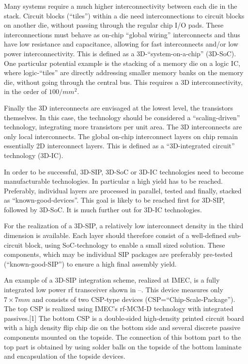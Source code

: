 Many systems require a much higher interconnectivity between
each die in the stack. Circuit blocks (``tiles'') within a die need
interconnections to circuit blocks on another die, without passing
through the regular chip I/O pads. These interconnections must
behave as on-chip ``global wiring'' interconnects and thus have low
resistance and capacitance, allowing for fast interconnects and/or
low power interconnectivity. This is defined as a 3D-``system-on-a-chip'' (3D-SoC). 
One particular potential example is the stacking
of a memory die on a logic IC, where logic-``tiles'' are directly
addressing smaller memory banks on the memory die, without
going through the central bus. This requires a 3D interconnectivity,
in the order of $100/mm^2$.

Finally the 3D interconnects are envisaged at the lowest level,
the transistors themselves. In this case, the technology should
be considered a ``scaling-driven'' technology, integrating more
transistors per unit area. The 3D interconnects are only local
interconnects. The global on-chip interconnect layers on chip
remain essentially 2D interconnect layers. This is defined as a
``3D-integrated circuit'' technology (3D-IC).

In order to be successful, 3D-SIP, 3D-SoC or 3D-IC technologies
need to become manufacturable technologies. In particular a
high yield has to be reached. Preferably, individual layers are
processed in parallel, tested and finally, stacked as ``known-good-devices''.
This goal is likely to be reached first for 3D-SIP, followed
by 3D-SoC. It is much further out for 3D-IC technologies.

For the realization of a 3D-SIP, a relatively low interconnect density
in the third dimension is available. Each layer should therefore
consist of a well-defined sub-circuit block, using SoC-technology
to enable a small sized solution. These components,
which may be individual SIP packages are preferably pre-tested
(``known-good-SIP'') to ensure a high final assembly yield.

An example of a 3D-SIP integration scheme, realized at IMEC, is
a fully integrated low power rf transceiver shown in --.
This device measures only $7 \times 7 mm$ and consists of two CSP-type
devices (CSP=``Chip-Scale-Package''). The top CSP is realized
using IMEC's rf-MCM-D technology with integrated passives.[1]
The bottom CSP is a double-sided high-density printed circuit
board with a high density flip chip die on the bottom side and
several discrete passive components mounted on the topside.
The connection of this bottom part to the top part is obtained by
using solder balls on the topside of the bottom laminate and
encapsulation of the topside devices.

